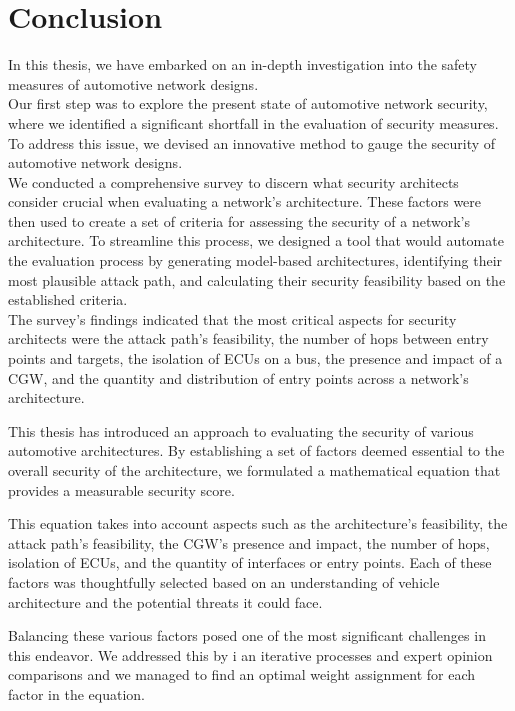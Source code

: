 \chapter{Conclusion}
\label{chp:conclusion}

In this thesis, we have embarked on an in-depth investigation into the safety measures of automotive network designs.\\

Our first step was to explore the present state of automotive network security, 
where we identified a significant shortfall in the evaluation of security measures. 
To address this issue, we devised an innovative method to gauge the security of automotive network designs.\\

We conducted a comprehensive survey to discern what security architects consider crucial when evaluating a network's architecture. 
These factors were then used to create a set of criteria for assessing the security of a network's architecture. 
To streamline this process, we designed a tool that would automate the evaluation process by generating model-based architectures, 
identifying their most plausible attack path, and calculating their security feasibility based on the established criteria.\\

The survey's findings indicated that the most critical aspects for security architects were the attack path's feasibility, 
the number of hops between entry points and targets, the isolation of ECUs on a bus, 
the presence and impact of a CGW, and the quantity and distribution of entry points across a network's architecture.

This thesis has introduced an approach to evaluating the security of various automotive architectures. 
By establishing a set of factors deemed essential to the overall security of the architecture, 
we formulated a mathematical equation that provides a measurable security score.

This equation takes into account aspects such as the architecture's feasibility, the attack path's feasibility, 
the CGW's presence and impact, the number of hops, isolation of ECUs, and the quantity of interfaces or entry points. 
Each of these factors was thoughtfully selected based on an understanding of vehicle architecture and the potential threats it could face.

Balancing these various factors posed one of the most significant challenges in this endeavor. 
We addressed this by i an iterative processes and expert opinion comparisons and
we managed to find an optimal weight assignment for each factor in the equation.

